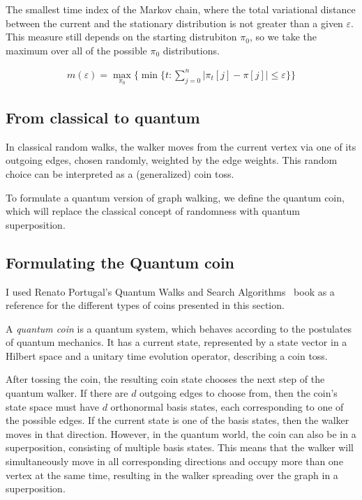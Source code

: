 \begin{definition} The smallest time index of the Markov chain, where the total variational distance between the current and the stationary distribution is not greater than a given $\varepsilon$. This measure still depends on the starting distrubiton $\pi_0$, so we take the maximum over all of the possible $\pi_0$ distributions.

\begin{align*}
m(\varepsilon) = \max\limits_{\pi_0}\{\min\{t : \sum\limits_{j=0}^{n}|\pi_t[j] - \pi[j]| \leq \varepsilon\}\}
\end{align*}

\end{definition}

\subsection{From classical to quantum}

In classical random walks, the walker moves from the current vertex via one of its outgoing edges, chosen randomly, weighted by the edge weights. This random choice can be interpreted as a (generalized) coin toss.

To formulate a quantum version of graph walking, we define the quantum coin, which will replace the classical concept of randomness with quantum superposition.

\subsection{Formulating the Quantum coin}

I used Renato Portugal's Quantum Walks and Search Algorithms~\cite{Portugal} book as a reference for the different types of coins presented in this section.

A \textit{quantum coin} is a quantum system, which behaves according to the postulates of quantum mechanics. It has a current state, represented by a state vector in a Hilbert space and a unitary time evolution operator, describing a coin toss.

After tossing the coin, the resulting coin state chooses the next step of the quantum walker. If there are $d$ outgoing edges to choose from, then the coin's state space must have $d$ orthonormal basis states, each corresponding to one of the possible edges. If the current state is one of the basis states, then the walker moves in that direction. However, in the quantum world, the coin can also be in a superposition, consisting of multiple basis states. This means that the walker will simultaneously move in all corresponding directions and occupy more than one vertex at the same time, resulting in the walker spreading over the graph in a superposition.

